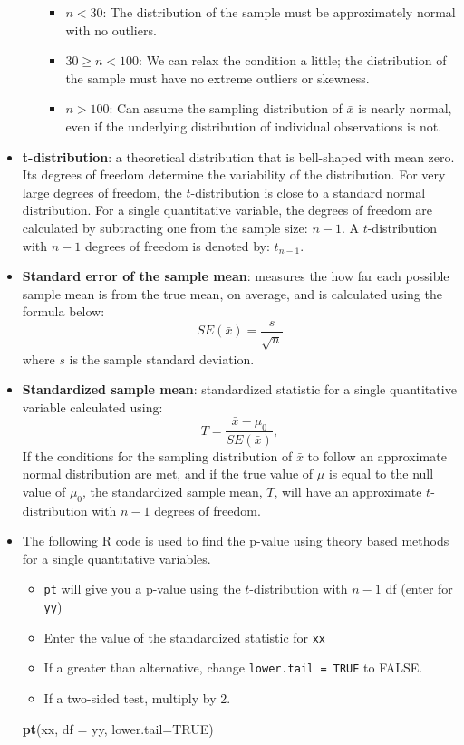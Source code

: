 \documentclass[
]{report}
\newenvironment{Shaded}{\begin{snugshade}}{\end{snugshade}}
\newcommand{\AttributeTok}[1]{\textcolor[rgb]{0.13,0.29,0.53}{#1}}
\newcommand{\ConstantTok}[1]{\textcolor[rgb]{0.56,0.35,0.01}{#1}}
\newcommand{\FunctionTok}[1]{\textcolor[rgb]{0.13,0.29,0.53}{\textbf{#1}}}
\newcommand{\NormalTok}[1]{#1}
\begin{document}
\begin{itemize}
\begin{itemize}
    \begin{itemize}
    \item
      \(n < 30\): The distribution of the sample must be approximately normal with no outliers.
    \item
      \(30 \ge n < 100\): We can relax the condition a little; the distribution of the sample must have no extreme outliers or skewness.
    \item
      \(n > 100\): Can assume the sampling distribution of \(\bar{x}\) is nearly normal, even if the underlying distribution of individual observations is not.
    \end{itemize}
  \end{itemize}
\item
  \textbf{t-distribution}: a theoretical distribution that is bell-shaped with mean zero. Its degrees of freedom determine the variability of the distribution. For very large degrees of freedom, the \(t\)-distribution is close to a standard normal distribution. For a single quantitative variable, the degrees of freedom are calculated by subtracting one from the sample size: \(n-1\). A \(t\)-distribution with \(n-1\) degrees of freedom is denoted by: \(t_{n-1}\).
\item
  \textbf{Standard error of the sample mean}: measures the how far each possible sample mean is from the true mean, on average, and is calculated using the formula below:
  \[SE(\bar{x})=\frac{s}{\sqrt{n}}\]
  where \(s\) is the sample standard deviation.
\item
  \textbf{Standardized sample mean}: standardized statistic for a single quantitative variable calculated using:
  \[
  T = \frac{\bar{x} - \mu_0}{SE(\bar{x})},
  \]
  If the conditions for the sampling distribution of \(\bar{x}\) to follow an approximate normal distribution are met, and if the true value of \(\mu\) is equal to the null value of \(\mu_0\), the standardized sample mean, \(T\), will have an approximate \(t\)-distribution with \(n-1\) degrees of freedom.
\item
  The following R code is used to find the p-value using theory based methods for a single quantitative variables.

  \begin{itemize}
  \item
    \texttt{pt} will give you a p-value using the \(t\)-distribution with \(n-1\) df (enter for \texttt{yy})
  \item
    Enter the value of the standardized statistic for \texttt{xx}
  \item
    If a greater than alternative, change \texttt{lower.tail\ =\ TRUE} to FALSE.
  \item
    If a two-sided test, multiply by 2.
  \end{itemize}

\begin{Shaded}
\begin{Highlighting}[]
\FunctionTok{pt}\NormalTok{(xx, }\AttributeTok{df =}\NormalTok{ yy, }\AttributeTok{lower.tail=}\ConstantTok{TRUE}\NormalTok{)}
\end{Highlighting}
\end{Shaded}
\end{itemize}
\end{document}
